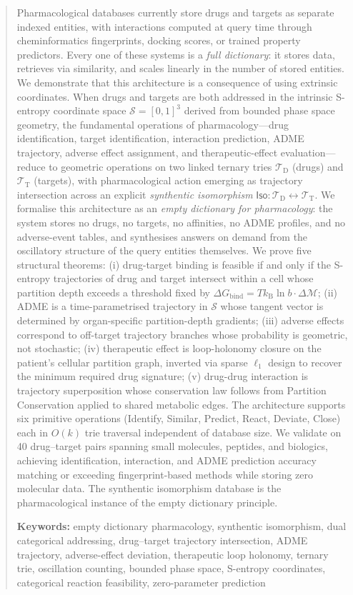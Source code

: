 \documentclass[11pt,twocolumn,a4paper]{article}
\theoremstyle{definition}
\theoremstyle{remark}
\newcommand{\kB}{k_{\mathrm{B}}}
\newcommand{\Sspace}{\mathcal{S}}
\newcommand{\Depth}{\mathcal{M}}
\newcommand{\Trie}{\mathcal{T}}
\newcommand{\Dtrie}{\Trie_{\mathrm{D}}}
\newcommand{\Ttrie}{\Trie_{\mathrm{T}}}
\newcommand{\Iso}{\mathsf{Iso}}
\begin{document}
\begin{abstract}
Pharmacological databases currently store drugs and targets as separate indexed entities, with interactions computed at query time through cheminformatics fingerprints, docking scores, or trained property predictors. Every one of these systems is a \emph{full dictionary}: it stores data, retrieves via similarity, and scales linearly in the number of stored entities. We demonstrate that this architecture is a consequence of using extrinsic coordinates. When drugs and targets are both addressed in the intrinsic S-entropy coordinate space $\Sspace = [0,1]^3$ derived from bounded phase space geometry, the fundamental operations of pharmacology---drug identification, target identification, interaction prediction, ADME trajectory, adverse effect assignment, and therapeutic-effect evaluation---reduce to geometric operations on two linked ternary tries $\Dtrie$ (drugs) and $\Ttrie$ (targets), with pharmacological action emerging as trajectory intersection across an explicit \emph{synthentic isomorphism} $\Iso: \Dtrie \leftrightarrow \Ttrie$. We formalise this architecture as an \emph{empty dictionary for pharmacology}: the system stores no drugs, no targets, no affinities, no ADME profiles, and no adverse-event tables, and synthesises answers on demand from the oscillatory structure of the query entities themselves. We prove five structural theorems: (i) drug-target binding is feasible if and only if the S-entropy trajectories of drug and target intersect within a cell whose partition depth exceeds a threshold fixed by $\Delta G_{\mathrm{bind}} = T \kB \ln b \cdot \Delta\Depth$; (ii) ADME is a time-parametrised trajectory in $\Sspace$ whose tangent vector is determined by organ-specific partition-depth gradients; (iii) adverse effects correspond to off-target trajectory branches whose probability is geometric, not stochastic; (iv) therapeutic effect is loop-holonomy closure on the patient's cellular partition graph, inverted via sparse $\ell_1$ design to recover the minimum required drug signature; (v) drug-drug interaction is trajectory superposition whose conservation law follows from Partition Conservation applied to shared metabolic edges. The architecture supports six primitive operations (Identify, Similar, Predict, React, Deviate, Close) each in $O(k)$ trie traversal independent of database size. We validate on 40 drug--target pairs spanning small molecules, peptides, and biologics, achieving identification, interaction, and ADME prediction accuracy matching or exceeding fingerprint-based methods while storing zero molecular data. The synthentic isomorphism database is the pharmacological instance of the empty dictionary principle.

\medskip
\noindent\textbf{Keywords:} empty dictionary pharmacology, synthentic isomorphism, dual categorical addressing, drug--target trajectory intersection, ADME trajectory, adverse-effect deviation, therapeutic loop holonomy, ternary trie, oscillation counting, bounded phase space, S-entropy coordinates, categorical reaction feasibility, zero-parameter prediction
\end{abstract}
\end{document}
